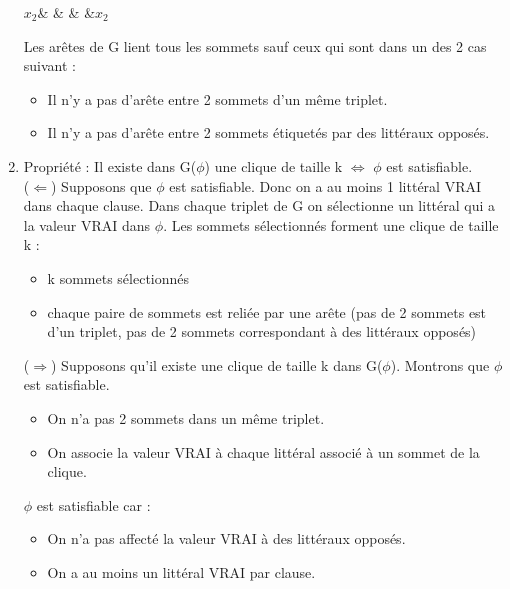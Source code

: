 \documentclass[12pt,a4paper]{article}
\begin{document}
\begin{enumerate}
\begin{center}
\begin{psmatrix}[mnode=circle]
			$x_2$&  &  &  &$x_2$
		\end{psmatrix}
	\end{center}
	Les arêtes de G lient tous les sommets sauf ceux qui sont dans un des 2 cas suivant :
	\begin{itemize}
		\item Il n'y a pas d'arête entre 2 sommets d'un même triplet.
		\item Il n'y a pas d'arête entre 2 sommets étiquetés par des littéraux opposés. 
	\end{itemize}
	\item Propriété : Il existe dans G($\phi$) une clique de taille k $\Leftrightarrow$ $\phi$ est satisfiable.\\
	($\Leftarrow$) Supposons que $\phi$ est satisfiable. Donc on a au moins 1 littéral VRAI dans chaque clause. Dans chaque triplet de G on sélectionne un littéral qui a la valeur VRAI dans $\phi$. Les sommets sélectionnés forment une clique de taille k :
	\begin{itemize}
		\item k sommets sélectionnés
		\item chaque paire de sommets est reliée par une arête (pas de 2 sommets est d'un triplet, pas de 2 sommets correspondant à des littéraux opposés)
	\end{itemize}
	($\Rightarrow$) Supposons qu'il existe une clique de taille k dans G($\phi$). Montrons que $\phi$ est satisfiable.
	\begin{itemize}
		\item On n'a pas 2 sommets dans un même triplet.
		\item On associe la valeur VRAI à chaque littéral associé à un sommet de la clique.
	\end{itemize}
	$\phi$ est satisfiable car :
	\begin{itemize}
		\item On n'a pas affecté la valeur VRAI à des littéraux opposés.
		\item On a au moins un littéral VRAI par clause.
	\end{itemize}
\end{enumerate}
\end{document}
